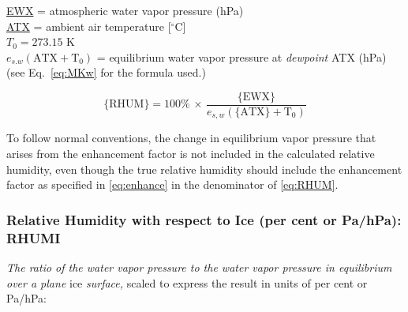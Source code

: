 \documentclass[
]{book}
\begin{document}
\protect\hyperlink{ewx}{EWX} = atmospheric water vapor pressure (hPa)\\
\protect\hyperlink{ambient-t}{ATX} = ambient air temperature {[}\(^{\circ}\mathrm{C}\){]}\\
\(T_{0}=273.15\) K\\
\(e_{s.w}(\mathrm{ATX+T_{0}})\) = equilibrium water vapor pressure
at \emph{dewpoint} ATX (hPa)\\
\hspace*{0.333em}\hspace*{0.333em}\hspace*{0.333em}\hspace*{0.333em}\hspace*{0.333em}\hspace*{0.333em}\hspace*{0.333em}\hspace*{0.333em}\hspace*{0.333em}\hspace*{0.333em}(see Eq.~\eqref{eq:MKw} for the formula
used.)

\begin{equation}
\mathrm{\{RHUM\}}=100\%\,\times\,\frac{\mathrm{\{EWX\}}}{e_{s,w}(\mathrm{\{ATX\}+T_{0}})}
\label{eq:RHUM}
\end{equation}

To follow normal conventions, the change in equilibrium vapor pressure that arises from the enhancement factor is not included in the calculated relative humidity, even though the true relative humidity should include the enhancement factor as specified in \eqref{eq:enhance} in the denominator of \eqref{eq:RHUM}.

\hypertarget{rhumi}{%
\subsubsection*{Relative Humidity with respect to Ice (per cent or Pa/hPa): RHUMI}\label{rhumi}}

\emph{The ratio of the water vapor pressure to the water vapor pressure in equilibrium over a plane} ice \emph{surface,} scaled to express the result in units of per cent or Pa/hPa:
\end{document}
